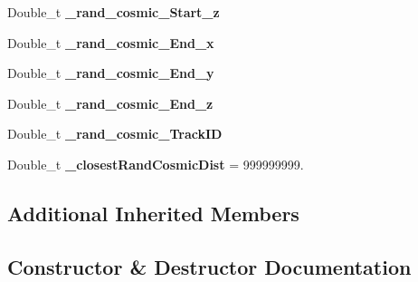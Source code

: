 \begin{DoxyCompactItemize}
\item 
Double\+\_\+t {\bfseries \+\_\+rand\+\_\+cosmic\+\_\+\+Start\+\_\+z}\hypertarget{classselection_1_1CRTApproachSelection_ac01829671455b1c595e944b00b2cfde4}{}\label{classselection_1_1CRTApproachSelection_ac01829671455b1c595e944b00b2cfde4}

\item 
Double\+\_\+t {\bfseries \+\_\+rand\+\_\+cosmic\+\_\+\+End\+\_\+x}\hypertarget{classselection_1_1CRTApproachSelection_abc2bb317bd856e749c2395407b4293f5}{}\label{classselection_1_1CRTApproachSelection_abc2bb317bd856e749c2395407b4293f5}

\item 
Double\+\_\+t {\bfseries \+\_\+rand\+\_\+cosmic\+\_\+\+End\+\_\+y}\hypertarget{classselection_1_1CRTApproachSelection_afe50ea2e4b51e72832e952836989c833}{}\label{classselection_1_1CRTApproachSelection_afe50ea2e4b51e72832e952836989c833}

\item 
Double\+\_\+t {\bfseries \+\_\+rand\+\_\+cosmic\+\_\+\+End\+\_\+z}\hypertarget{classselection_1_1CRTApproachSelection_aa7e0dd80764787acb3a4201f17f731eb}{}\label{classselection_1_1CRTApproachSelection_aa7e0dd80764787acb3a4201f17f731eb}

\item 
Double\+\_\+t {\bfseries \+\_\+rand\+\_\+cosmic\+\_\+\+Track\+ID}\hypertarget{classselection_1_1CRTApproachSelection_ad0c733ea5c72da5dadc0305ffc8c76d0}{}\label{classselection_1_1CRTApproachSelection_ad0c733ea5c72da5dadc0305ffc8c76d0}

\item 
Double\+\_\+t {\bfseries \+\_\+closest\+Rand\+Cosmic\+Dist} = 999999999.\hypertarget{classselection_1_1CRTApproachSelection_af6412c820768d9db1ee2ad8c699f0d4f}{}\label{classselection_1_1CRTApproachSelection_af6412c820768d9db1ee2ad8c699f0d4f}

\end{DoxyCompactItemize}
\subsection*{Additional Inherited Members}


\subsection{Constructor \& Destructor Documentation}

